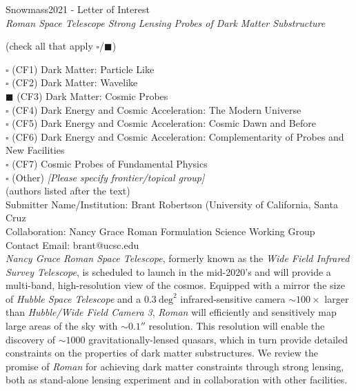 \documentclass[11pt]{article}
\newcommand{\RST}{\emph{Roman}\xspace}
\begin{document}
\begin{raggedright} 
\huge
Snowmass2021 - Letter of Interest \hfill \\[+1em]
\textit{Roman Space Telescope Strong Lensing Probes of Dark Matter Substructure} \hfill \\[+1em]
\end{raggedright}

\normalsize

  (check all that apply $\square$/$\blacksquare$)

\noindent $\square$ (CF1) Dark Matter: Particle Like \\
\noindent $\square$ (CF2) Dark Matter: Wavelike  \\ 
\noindent $\blacksquare$ (CF3) Dark Matter: Cosmic Probes  \\
\noindent $\square$ (CF4) Dark Energy and Cosmic Acceleration: The Modern Universe \\
\noindent $\square$ (CF5) Dark Energy and Cosmic Acceleration: Cosmic Dawn and Before \\
\noindent $\square$ (CF6) Dark Energy and Cosmic Acceleration: Complementarity of Probes and New Facilities \\
\noindent $\square$ (CF7) Cosmic Probes of Fundamental Physics \\
\noindent $\square$ (Other) {\it [Please specify frontier/topical group]} \\

 (authors listed after the text)\\
Submitter Name/Institution: Brant Robertson (University of California, Santa Cruz\\
Collaboration: Nancy Grace Roman Formulation Science Working Group\\
Contact Email: brant@ucsc.edu\\

\emph{Nancy Grace Roman Space Telescope}, formerly known as 
the \emph{Wide Field Infrared Survey Telescope}, is scheduled to launch in the mid-2020's and will provide a
multi-band, high-resolution view of the cosmos. Equipped with a mirror the size of \emph{Hubble
Space Telescope} and a $0.3~\mathrm{deg}^2$ infrared-sensitive camera $\sim100\times$ larger than \emph{Hubble/Wide Field Camera 3},
\RST will efficiently and sensitively map large areas of the sky with $\sim0.1''$ resolution.
This resolution will enable the discovery of $\sim 1000$ gravitationally-lensed quasars, which 
in turn provide detailed constraints on the properties of dark matter substructures. We
review the promise of \RST for achieving dark matter constraints through strong lensing,
both as stand-alone lensing experiment and in collaboration with other facilities.
\end{document}
